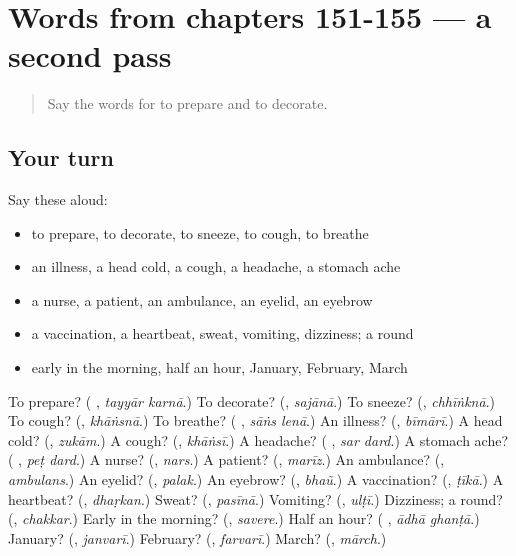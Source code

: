 \section[(dialogue)]{Words from chapters 151-155 — a second pass}

\label{lesson:UR-R155-second-pass-words-from-chapters-151-155}



\begin{quote}
Say the words for to prepare and to decorate.
\end{quote}

\subsection*{Your turn}
Say these aloud:

\begin{itemize}
\raggedright
  \item to prepare, to decorate, to sneeze, to cough, to breathe
  \item an illness, a head cold, a cough, a headache, a stomach ache
  \item a nurse, a patient, an ambulance, an eyelid, an eyebrow
  \item a vaccination, a heartbeat, sweat, vomiting, dizziness; a round
  \item early in the morning, half an hour, January, February, March
\end{itemize}

\begin{tcolorbox}[breakable,colback=teal!4,colframe=teal!35!black,title={Before you move on}]
To prepare? (\textbf{ }, \emph{tayyār karnā}.) To decorate? (\textbf{}, \emph{sajānā}.) To sneeze? (\textbf{}, \emph{chhīṅknā}.) To cough? (\textbf{}, \emph{khāṅsnā}.) To breathe? (\textbf{ }, \emph{sāṅs lenā}.) An illness? (\textbf{}, \emph{bīmārī}.) A head cold? (\textbf{}, \emph{zukām}.) A cough? (\textbf{}, \emph{khāṅsī}.) A headache? (\textbf{ }, \emph{sar dard}.) A stomach ache? (\textbf{ }, \emph{peṭ dard}.) A nurse? (\textbf{}, \emph{nars}.) A patient? (\textbf{}, \emph{marīz}.) An ambulance? (\textbf{}, \emph{ambulans}.) An eyelid? (\textbf{}, \emph{palak}.) An eyebrow? (\textbf{}, \emph{bhaũ}.) A vaccination? (\textbf{}, \emph{ṭīkā}.) A heartbeat? (\textbf{}, \emph{dhaṛkan}.) Sweat? (\textbf{}, \emph{pasīnā}.) Vomiting? (\textbf{}, \emph{ulṭī}.) Dizziness; a round? (\textbf{}, \emph{chakkar}.) Early in the morning? (\textbf{}, \emph{savere}.) Half an hour? (\textbf{ }, \emph{ādhā ghanṭā}.) January? (\textbf{}, \emph{janvarī}.) February? (\textbf{}, \emph{farvarī}.) March? (\textbf{}, \emph{mārch}.)
\end{tcolorbox}
